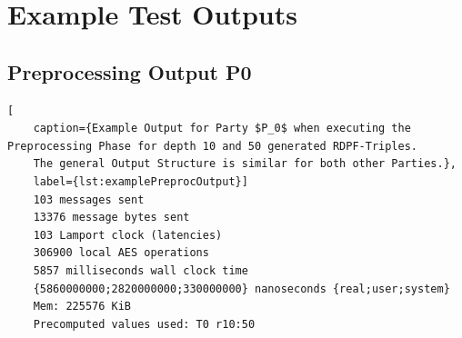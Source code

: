 \section{Example Test Outputs}
\subsection{Preprocessing Output P0}
\begin{lstlisting}[
    caption={Example Output for Party $P_0$ when executing the Preprocessing Phase for depth 10 and 50 generated RDPF-Triples.
    The general Output Structure is similar for both other Parties.},
    label={lst:examplePreprocOutput}]
    103 messages sent
    13376 message bytes sent
    103 Lamport clock (latencies)
    306900 local AES operations
    5857 milliseconds wall clock time
    {5860000000;2820000000;330000000} nanoseconds {real;user;system}
    Mem: 225576 KiB
    Precomputed values used: T0 r10:50
\end{lstlisting}


